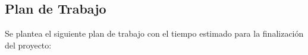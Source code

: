 \documentclass[10pt,a4paper]{article}
\begin{document}
	
	
	\clearpage

	\subsection{Plan de Trabajo}
	
	Se plantea el siguiente plan de trabajo con el tiempo estimado para la finalización del proyecto:
	
\end{document}
